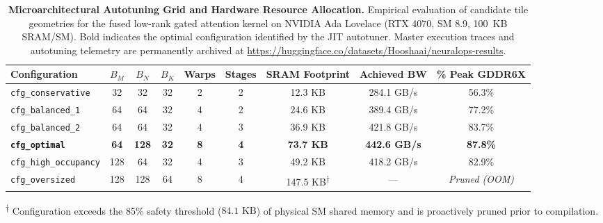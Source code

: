 \begin{table}[t]
\centering
\small
\caption[Microarchitectural Autotuning Grid and Hardware Resource Allocation]{\textbf{Microarchitectural Autotuning Grid and Hardware Resource Allocation.} Empirical evaluation of candidate tile geometries for the fused low-rank gated attention kernel on NVIDIA Ada Lovelace (RTX 4070, SM 8.9, 100~KB SRAM/SM). Bold indicates the optimal configuration identified by the JIT autotuner. Master execution traces and autotuning telemetry are permanently archived at \url{https://huggingface.co/datasets/Hooshaai/neuralops-results}.}
\label{tab:triton_autotune_grid}
\begin{tabular}{@{}lcccccccc@{}}
\toprule
\textbf{Configuration} & $B_M$ & $B_N$ & $B_K$ & \textbf{Warps} & \textbf{Stages} & \textbf{SRAM Footprint} & \textbf{Achieved BW} & \textbf{\% Peak GDDR6X} \\
\midrule
\texttt{cfg\_conservative} & 32 & 32 & 32 & 2 & 2 & 12.3 KB & 284.1 GB/s & 56.3\% \\
\texttt{cfg\_balanced\_1}   & 64 & 64 & 32 & 4 & 2 & 24.6 KB & 389.4 GB/s & 77.2\% \\
\texttt{cfg\_balanced\_2}   & 64 & 64 & 32 & 4 & 3 & 36.9 KB & 421.8 GB/s & 83.7\% \\
\textbf{\texttt{cfg\_optimal}} & \textbf{64} & \textbf{128} & \textbf{32} & \textbf{8} & \textbf{4} & \textbf{73.7 KB} & \textbf{442.6 GB/s} & \textbf{87.8\%} \\
\texttt{cfg\_high\_occupancy}& 128 & 64 & 32 & 4 & 3 & 49.2 KB & 418.2 GB/s & 82.9\% \\
\texttt{cfg\_oversized}     & 128 & 128 & 64 & 8 & 4 & 147.5 KB\textsuperscript{$\dagger$} & --- & \emph{Pruned (OOM)} \\
\bottomrule
\end{tabular}
\vskip 4pt
\noindent\footnotesize \textsuperscript{$\dagger$} Configuration exceeds the 85\% safety threshold ($84.1\text{ KB}$) of physical SM shared memory and is proactively pruned prior to compilation.
\end{table}

